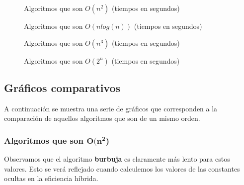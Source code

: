 \documentclass[11pt]{article}
\begin{document}
 {\floydlinuxOCero}
 {\hanoilinuxOCero}

\begin{figure}[H]
	\centering
	\caption*{Algoritmos que son $O(n^2)$ (tiempos en segundos)}
	\pgfplotstabletypeset[columns={0, Burbuja, Selección, Inserción}]{\burbujalinuxOCero}
\end{figure}


\begin{figure}[H]
	\centering
	\caption*{Algoritmos que son $O(nlog(n))$ (tiempos en segundos)}
	\pgfplotstabletypeset[columns={0, Mergesort, Quicksort, Heapsort}]{\mergesortlinuxOCero}
\end{figure}

\begin{figure}[H]
	\centering
	\caption*{Algoritmos que son $O(n^3)$ (tiempos en segundos)}
	\pgfplotstabletypeset[columns={0, Floyd}]{\floydlinuxOCero}
\end{figure}


\begin{figure}[H]
	\centering
	\caption*{Algoritmos que son $O(2^n)$ (tiempos en segundos)}
	\pgfplotstabletypeset[columns={0, Hanoi}]{\hanoilinuxOCero}
\end{figure}


\newpage
\subsection*{Gráficos comparativos}

A continuación se muestra una serie de gráficos que corresponden a la comparación de aquellos algoritmos que son de un mismo orden.

\subsubsection*{Algoritmos que son $\boldsymbol{O(n^2}$)}

\begin{center}
	
\end{center}

\vspace{1em}
Observamos que el algoritmo \textbf{burbuja} es claramente más lento para estos valores. Esto se verá reflejado cuando calculemos los valores de las constantes ocultas en la eficiencia híbrida.
\end{document}
